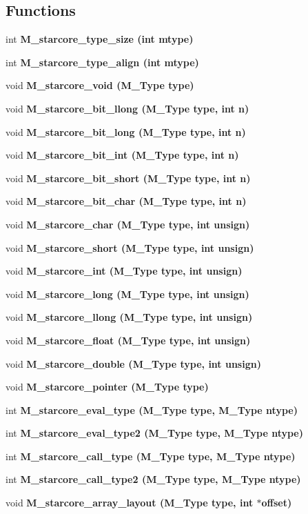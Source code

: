 \subsection*{Functions}
\begin{CompactItemize}
\item 
int \bf{M\_\-starcore\_\-type\_\-size} (int mtype)
\item 
int \bf{M\_\-starcore\_\-type\_\-align} (int mtype)
\item 
void \bf{M\_\-starcore\_\-void} (\bf{M\_\-Type} type)
\item 
void \bf{M\_\-starcore\_\-bit\_\-llong} (\bf{M\_\-Type} type, int n)
\item 
void \bf{M\_\-starcore\_\-bit\_\-long} (\bf{M\_\-Type} type, int n)
\item 
void \bf{M\_\-starcore\_\-bit\_\-int} (\bf{M\_\-Type} type, int n)
\item 
void \bf{M\_\-starcore\_\-bit\_\-short} (\bf{M\_\-Type} type, int n)
\item 
void \bf{M\_\-starcore\_\-bit\_\-char} (\bf{M\_\-Type} type, int n)
\item 
void \bf{M\_\-starcore\_\-char} (\bf{M\_\-Type} type, int unsign)
\item 
void \bf{M\_\-starcore\_\-short} (\bf{M\_\-Type} type, int unsign)
\item 
void \bf{M\_\-starcore\_\-int} (\bf{M\_\-Type} type, int unsign)
\item 
void \bf{M\_\-starcore\_\-long} (\bf{M\_\-Type} type, int unsign)
\item 
void \bf{M\_\-starcore\_\-llong} (\bf{M\_\-Type} type, int unsign)
\item 
void \bf{M\_\-starcore\_\-float} (\bf{M\_\-Type} type, int unsign)
\item 
void \bf{M\_\-starcore\_\-double} (\bf{M\_\-Type} type, int unsign)
\item 
void \bf{M\_\-starcore\_\-pointer} (\bf{M\_\-Type} type)
\item 
int \bf{M\_\-starcore\_\-eval\_\-type} (\bf{M\_\-Type} type, \bf{M\_\-Type} ntype)
\item 
int \bf{M\_\-starcore\_\-eval\_\-type2} (\bf{M\_\-Type} type, \bf{M\_\-Type} ntype)
\item 
int \bf{M\_\-starcore\_\-call\_\-type} (\bf{M\_\-Type} type, \bf{M\_\-Type} ntype)
\item 
int \bf{M\_\-starcore\_\-call\_\-type2} (\bf{M\_\-Type} type, \bf{M\_\-Type} ntype)
\item 
void \bf{M\_\-starcore\_\-array\_\-layout} (\bf{M\_\-Type} type, int $\ast$offset)

\end{CompactItemize}
